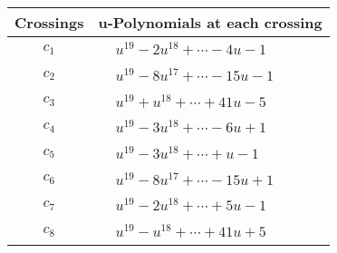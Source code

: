 \documentclass[1p]{elsarticle_modified}
\theoremstyle{definition}
\begin{document}
\begin{tabular}{m{50pt}|m{274pt}}
Crossings & \hspace{64pt}u-Polynomials at each crossing \\
\hline $$\begin{aligned}c_{1}\end{aligned}$$&$\begin{aligned}
&u^{19}-2 u^{18}+\cdots-4 u-1
\end{aligned}$\\
\hline $$\begin{aligned}c_{2}\end{aligned}$$&$\begin{aligned}
&u^{19}-8 u^{17}+\cdots-15 u-1
\end{aligned}$\\
\hline $$\begin{aligned}c_{3}\end{aligned}$$&$\begin{aligned}
&u^{19}+u^{18}+\cdots+41 u-5
\end{aligned}$\\
\hline $$\begin{aligned}c_{4}\end{aligned}$$&$\begin{aligned}
&u^{19}-3 u^{18}+\cdots-6 u+1
\end{aligned}$\\
\hline $$\begin{aligned}c_{5}\end{aligned}$$&$\begin{aligned}
&u^{19}-3 u^{18}+\cdots+u-1
\end{aligned}$\\
\hline $$\begin{aligned}c_{6}\end{aligned}$$&$\begin{aligned}
&u^{19}-8 u^{17}+\cdots-15 u+1
\end{aligned}$\\
\hline $$\begin{aligned}c_{7}\end{aligned}$$&$\begin{aligned}
&u^{19}-2 u^{18}+\cdots+5 u-1
\end{aligned}$\\
\hline $$\begin{aligned}c_{8}\end{aligned}$$&$\begin{aligned}
&u^{19}- u^{18}+\cdots+41 u+5
\end{aligned}$\\

\end{tabular}
\end{document}
